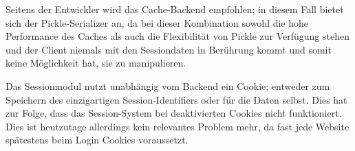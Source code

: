 \begin{description}
Seitens der Entwickler wird das Cache-Backend empfohlen; in diesem Fall bietet sich der
Pickle-Serializer an, da bei dieser Kombination sowohl die hohe Performance des Caches als auch die
Flexibilität von Pickle zur Verfügung stehen und der Client niemals mit den Sessiondaten in
Berührung kommt und somit keine Möglichkeit hat, sie zu manipulieren.

Das Sessionmodul nutzt unabhängig vom Backend ein Cookie; entweder zum Speichern des einzigartigen
Session-Identifiers oder für die Daten selbst. Dies hat zur Folge, dass das Session-System bei
deaktivierten Cookies nicht funktioniert. Dies ist heutzutage allerdings kein relevantes Problem
mehr, da fast jede Website spätestens beim Login Cookies voraussetzt.


\end{description}
